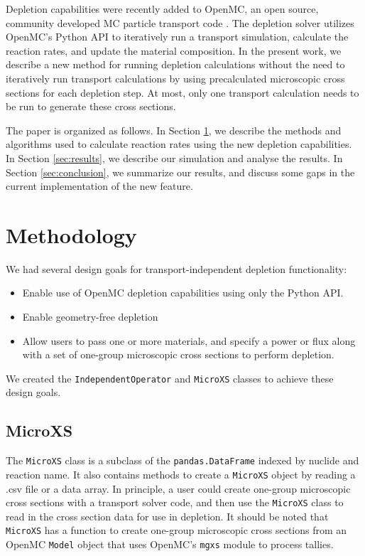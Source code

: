 \documentclass[a4paper,fleqn]{cas-dc}
\begin{document}
    Depletion capabilities were recently added to OpenMC, an open source,
    community developed MC particle transport code \cite{romano_openmc_2015}
    \cite{romano_depletion_2021}. The depletion solver utilizes OpenMC's Python
    API to iteratively run a transport simulation, calculate the reaction rates,
    and update the material composition. In the present work, we describe a new
    method for running depletion calculations without the need to iteratively
    run transport calculations by using precalculated microscopic cross sections
    for each depletion step. At most, only one transport calculation needs to be
    run to generate these cross sections.

    The paper is organized as follows. In Section \ref{sec:methods}, we describe
    the methods and algorithms used to calculate reaction rates using the new
    depletion capabilities. In Section \ref{sec:results}, we describe our
    simulation and analyse the results. In Section \ref{sec:conclusion}, we
    summarize our results, and discuss some gaps in the current implementation
    of the new feature.

\section{Methodology}
    \label{sec:methods}
    We had several design goals for transport-independent depletion functionality:
    \begin{itemize}
        \item Enable use of OpenMC depletion capabilities using only the Python API.
        \item Enable geometry-free depletion
        \item Allow users to pass one or more materials, and specify a power or
            flux along with a set of one-group microscopic cross sections to
            perform depletion.
    \end{itemize}
    
    We created the \verb.IndependentOperator. and \verb.MicroXS. classes to
    achieve these design goals.
    
    \subsection{MicroXS}
        The \verb.MicroXS. class is a subclass of the \verb,pandas.DataFrame,
        indexed by nuclide and reaction name. It also contains methods to create
        a \verb.MicroXS. object by reading a .csv file or a data array. In
        principle, a user could create one-group microscopic cross sections with
        a transport solver code, and then use the \verb.MicroXS. class to read in the
        cross section data for use in depletion. It should be noted that
        \verb.MicroXS. has a function to create one-group microscopic cross
        sections from an OpenMC \verb.Model. object that uses OpenMC's
        \verb.mgxs. module to process tallies.
\end{document}
